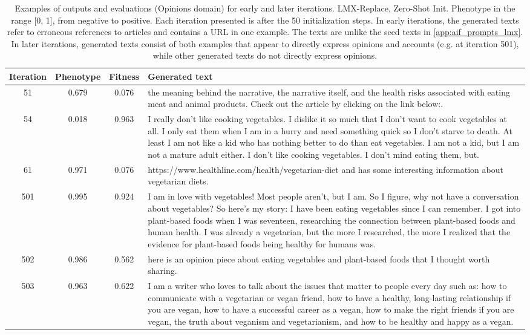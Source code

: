 \begin{table}[ht]
  \caption{Examples of outputs and evaluations (Opinions domain) for early and later iterations. LMX-Replace, Zero-Shot Init. Phenotype in the range [0, 1], from negative to positive. Each iteration presented is after the 50 initialization steps. In early iterations, the generated texts refer to erroneous references to articles and contains a URL in one example. The texts are unlike the seed texts in \ref{app:aif_prompts_lmx}. In later iterations, generated texts consist of both examples that appear to directly express opinions and accounts (e.g. at iteration 501), while other generated texts do not directly express opinions.}
  \begin{center}
  \small
  \begin{tabular}{cccp{8.5cm}}
    \toprule
    Iteration     & Phenotype  & Fitness     & Generated text \\
    \midrule
    51 &  0.679 & 0.076 &  the meaning behind the narrative, the narrative itself, and the health risks associated with eating meat and animal products. Check out the article by clicking on the link below:. \\
    \midrule
    54 & 0.018 & 0.963 &  I really don’t like cooking vegetables. I dislike it so much that I don’t want to cook vegetables at all. I only eat them when I am in a hurry and need something quick so I don’t starve to death. At least I am not like a kid who has nothing better to do than eat vegetables. I am not a kid, but I am not a mature adult either. I don’t like cooking vegetables. I don’t mind eating them, but. \\
    \midrule
    61 & 0.971 & 0.076 &  https://www.healthline.com/health/vegetarian-diet and has some interesting information about vegetarian diets. \\
    \midrule
    \midrule
    501 &  0.995 & 0.924 & I am in love with vegetables! Most people aren’t, but I am. So I figure, why not have a conversation about vegetables? So here’s my story: I have been eating vegetables since I can remember. I got into plant-based foods when I was seventeen, researching the connection between plant-based foods and human health. I was already a vegetarian, but the more I researched, the more I realized that the evidence for plant-based foods being healthy for humans was. \\
    \midrule
    502 & 0.986 & 0.562 & here is an opinion piece about eating vegetables and plant-based foods that I thought worth sharing. \\
    \midrule
    503 & 0.963 & 0.622 & I am a writer who loves to talk about the issues that matter to people every day such as: how to communicate with a vegetarian or vegan friend, how to have a healthy, long-lasting relationship if you are vegan, how to have a successful career as a vegan, how to make the right friends if you are vegan, the truth about veganism and vegetarianism, and how to be healthy and happy as a vegan. \\
    \bottomrule
  \end{tabular}
  \end{center}
  \label{app:table_iter_opinions_replace_zero}
\end{table}

